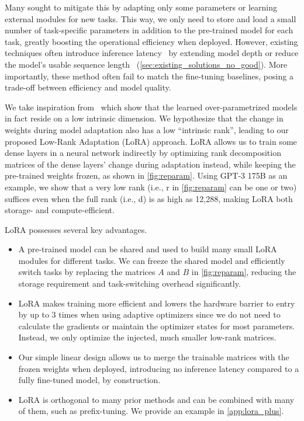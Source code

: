 \documentclass{article} %
\begin{document}
Many sought to mitigate this by adapting only some parameters or learning external modules for new tasks.
This way, we only need to store and load a small number of task-specific parameters in addition to the pre-trained model for each task, greatly boosting the operational efficiency when deployed.
However, existing techniques often introduce inference latency~\citep{houlsby_parameter-efficient_2019, rebuffi_learning_2017} by extending model depth or reduce the model's usable sequence length~\citep{li_prefix-tuning_2021, lester_power_2021, hambardzumyan_warp_2020, liu_gpt_2021} (\autoref{sec:existing_solutions_no_good}).
More importantly, these method often fail to match the fine-tuning baselines, posing a trade-off between efficiency and model quality.

We take inspiration from~\cite{li_measuring_2018, aghajanyan_intrinsic_2020} which show that the learned over-parametrized models in fact reside on a low intrinsic dimension.
We hypothesize that the change in weights during model adaptation also has a low ``intrinsic rank'', leading to our proposed Low-Rank Adaptation (LoRA) approach.
LoRA allows us to train some dense layers in a neural network indirectly by optimizing rank decomposition matrices of the dense layers' change during adaptation instead, while keeping the pre-trained weights frozen, as shown in \autoref{fig:reparam}.
Using GPT-3 175B as an example, we show that a very low rank (i.e., r in \autoref{fig:reparam} can be one or two) suffices even when the full rank (i.e., d) is as high as 12,288, making LoRA both storage- and compute-efficient.

LoRA possesses several key advantages.
\begin{itemize}[topsep=6pt,itemsep=3pt,partopsep=4pt, parsep=4pt]
\item
A pre-trained model can be shared and used to build many small LoRA modules for different tasks.
We can freeze the shared model and efficiently switch tasks by replacing the matrices $A$ and $B$ in \autoref{fig:reparam}, reducing the storage requirement and task-switching overhead significantly.

\item
LoRA makes training more efficient and lowers the hardware barrier to entry by up to 3 times when using adaptive optimizers since we do not need to calculate the gradients or maintain the optimizer states for most parameters.
Instead, we only optimize the injected, much smaller low-rank matrices.%

\item
Our simple linear design allows us to merge the trainable matrices with the frozen weights when deployed, introducing no inference latency compared to a fully fine-tuned model, by construction.

\item
LoRA is orthogonal to many prior methods and can be combined with many of them, such as prefix-tuning. We provide an example in \autoref{app:lora_plus}.

\end{itemize}
\end{document}
